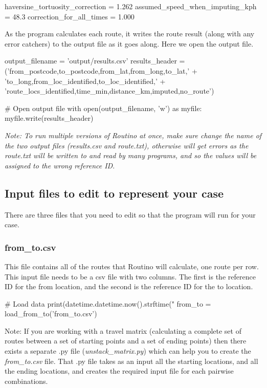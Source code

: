 \documentclass{article}
\begin{document}
\begin{flushleft}
\begin{python}
	haversine_tortuosity_correction = 1.262
	assumed_speed_when_imputing_kph = 48.3
	correction_for_all_times = 1.000
\end{python}

As the program calculates each route, it writes the route result (along with any error catchers) to the output file as it goes along. Here we open the output file. 

\begin{python}
	output_filename = 'output/results.csv'
	results_header = ('from_postcode,to_postcode,from_lat,from_long,to_lat,' +
	'to_long,from_loc_identified,to_loc_identified,' +
	'route_locs_identified,time_min,distance_km,imputed,no_route\n')
	
	# Open output file
	with open(output_filename, 'w') as myfile:	
	myfile.write(results_header)
\end{python}

\textit{Note: To run multiple versions of Routino at once, make sure change the name of the two output files (results.csv and route.txt), otherwise will get errors as the route.txt will be written to and read by many programs, and so the values will be assigned to the wrong reference ID}.\\

\vspace{\baselineskip}

\subsection{Input files to edit to represent your case}
There are three files that you need to edit so that the program will run for your case.

\subsubsection{from\_to.csv}
This file contains all of the routes that Routino will calculate, one route per row. This input file needs to be a csv file with two columns. The first is the reference ID for the from location, and the second is the reference ID for the to location.

\begin{python}
    # Load data
	print(datetime.datetime.now().strftime("%
	from_to = load_from_to('from_to.csv')
\end{python}

\begin{flushleft}{\footnotesize Note:  If you are working with a travel matrix (calculating a complete set of routes between a set of starting points and a set of ending points) then there exists a separate .py file (\textit{unstack\_matrix.py}) which can help you to create the \textit{from\_to.csv} file. That .py file takes as an input all the starting locations, and all the ending locations, and creates the required input file for each pairwise combinations.}\end{flushleft}


\end{flushleft}
\end{document}
